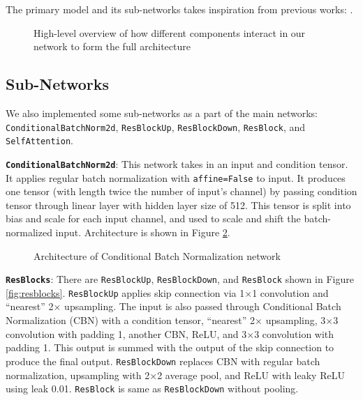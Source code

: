 \documentclass{article} %
\begin{document}
The primary model and its sub-networks takes inspiration from previous works: \citep{handwritingGANGeneration} \citep{brock2019large} \citep{zhang2019selfattention} \citep{NIPS2017_6fab6e3a} \citep{BlucheM17} \citep{fr-crnn}.

\begin{figure}[!hbpt]
    \begin{center}
        
    \end{center}
    \caption{High-level overview of how different components interact in our network to form the full architecture}
    \label{fig:model_overview}
\end{figure}

\subsection{Sub-Networks}
We also implemented some sub-networks as a part of the main networks: \texttt{ConditionalBatchNorm2d}, \texttt{ResBlockUp}, \texttt{ResBlockDown}, \texttt{ResBlock}, and \texttt{SelfAttention}.

{\bf\texttt{ConditionalBatchNorm2d}}: This network takes in an input and condition tensor. It applies regular batch normalization with \texttt{affine=False} to input. It produces one tensor (with length twice the number of input's channel) by passing condition tensor through linear layer with hidden layer size of 512. This tensor is split into bias and scale for each input channel, and used to scale and shift the batch-normalized input. Architecture is shown in Figure \ref{fig:cbn}.

\begin{figure}[!hbpt]
    \begin{center}
        
    \end{center}
    \caption{Architecture of Conditional Batch Normalization network}
    \label{fig:cbn}
\end{figure}

{\bf\texttt{ResBlocks}}: There are \texttt{ResBlockUp}, \texttt{ResBlockDown}, and \texttt{ResBlock} shown in Figure \ref{fig:resblocks}. \texttt{ResBlockUp} applies skip connection via 1$\times$1 convolution and ``nearest'' 2$\times$ upsampling. The input is also passed through Conditional Batch Normalization (CBN) with a condition tensor, ``nearest'' 2$\times$ upsampling, 3$\times$3 convolution with padding 1, another CBN, ReLU, and 3$\times$3 convolution with padding 1. This output is summed with the output of the skip connection to produce the final output. \texttt{ResBlockDown} replaces CBN with regular batch normalization, upsampling with 2$\times$2 average pool, and ReLU with leaky ReLU using leak 0.01. \texttt{ResBlock} is same as \texttt{ResBlockDown} without pooling.
\end{document}
